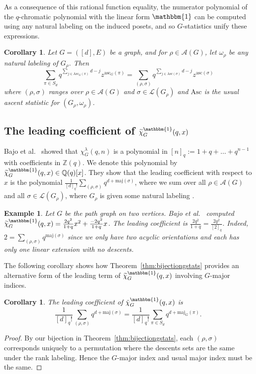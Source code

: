 \documentclass[11pt]{amsart}
\newtheorem{corollary}[theorem]{Corollary}
\newtheorem{exam}{Example}
\newenvironment{example}{\begin{exam}\sf}{\end{exam}}
\newcommand{\maj}{\mathrm{maj}}
\newcommand{\asc}{\mathrm{Asc}}
\newcommand{\ascnum}{\mathrm{asc}}
\newcommand{\acyclic}[1]{\mathcal{A}(#1)}
\newcommand{\jhset}[1]{\mathcal{L}(#1)}
\begin{document}
As a consequence of this rational function equality, the numerator polynomial of the $q$-chromatic polynomial with the linear form $\mathbbm{1}$ can be computed using any natural labeling on the induced posets, and so $G$-statistics unify these expressions.

\begin{corollary}\label{cor:linearextensionnumerator}
    Let $G = ([d],E)$ be a graph, and for $\rho \in \acyclic{G}$, let $\omega_\rho$ be any natural labeling of $G_\rho$. Then
    \[
        \sum_{\pi \in S_d} q^{\sum_{j \in \asc_G(\pi)} d-j} z^{\ascnum_G(\pi)}= \sum_{(\rho,\sigma)} q^{\sum_{j \in \asc(\sigma)} d-j} z^{\ascnum(\sigma)}
    \]
    where $(\rho,\sigma)$ ranges over $\rho \in \acyclic{G}$ and $\sigma \in \jhset{G_\rho}$ and $\asc$ is the usual ascent statistic for $(G_\rho,\omega_\rho)$.
\end{corollary}

\subsection{The leading coefficient of $\widetilde{\chi}_G^\mathbbm{1}(q,x)$}\label{subsec:gmajorpoly}

Bajo et al.~\cite{qchromatic} showed that $\chi_G^\lambda(q,n)$ is a polynomial
in $[n]_q := 1 + q + \dots + q^{ n-1 } $ with coefficients in $\mathbb{Z}(q)$.
We denote this polynomial by $\widetilde{\chi}_G^\mathbbm{1}(q,x) \in \mathbb{Q}(q)[x]$.
They show that the leading coefficient with respect to $x$ is the polynomial $\frac{1}{[d]_q!} \sum_{(\rho,\sigma)} q^{d +\maj(\sigma)}$, where we sum over all $\rho \in \acyclic{G}$ and all $\sigma \in \jhset{G_\rho}$, where $G_\rho$ is given some natural labeling \cite{qchromatic}. 

\begin{example}
    Let $G$ be the path graph on two vertices. 
    Bajo et al.~\cite{qchromatic} computed  $\widetilde{\chi}_G^\mathbbm{1}(q,x) = \frac{2 q^2}{1+q} x^2 + \frac{-2q^2}{1+q}x$. 
    The leading coefficient is $\frac{2 q^2}{1+q} = \frac{2q^2}{[2]_q} $.
    Indeed, $2 = \sum_{(\rho,\sigma)} q^{\maj(\sigma)}$ since we only have two acyclic orientations and each has only one linear extension with no descents.
\end{example}

The following corollary shows how Theorem~\ref{thm:bijectiongstats} provides an alternative form of the leading term of $\widetilde{\chi}_G^\mathbbm{1}(q,x)$ involving $G$-major indices.
\begin{corollary}\label{cor:leadingcoef}
    The leading coefficient of $\tilde{\chi}_G^\mathbbm{1}(q,x)$ is 
    \[
        \frac{1}{[d]_q!} \sum_{(\rho,\sigma)} q^{d + \maj(\sigma)} = \frac{1}{[d]_q!}\sum_{\pi \in S_d}
q^{d+\maj_G(\pi)} .
    \]
\end{corollary}
\begin{proof}
    By our bijection in Theorem~\ref{thm:bijectiongstats}, each $(\rho,\sigma)$ corresponds uniquely to a permutation where the descents sets are the same under the rank labeling. Hence the $G$-major index and usual major index must be the same. 
\end{proof}
\end{document}
